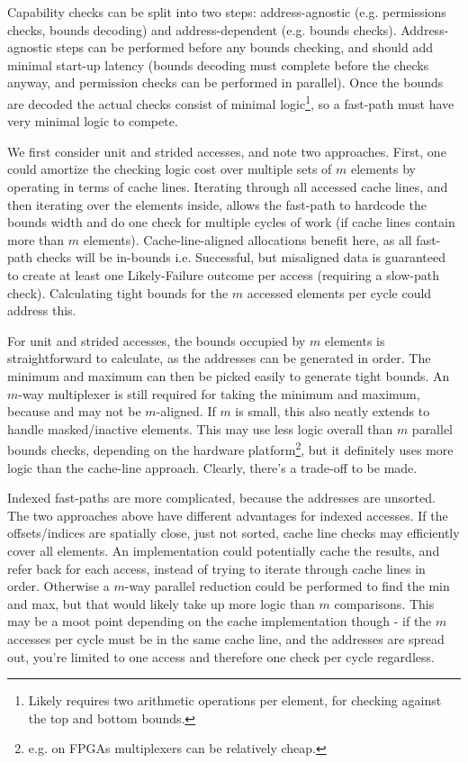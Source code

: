 Capability checks can be split into two steps: address-agnostic (e.g. permissions checks, bounds decoding) and address-dependent (e.g. bounds checks).
Address-agnostic steps can be performed before any bounds checking, and should add minimal start-up latency (bounds decoding must complete before the checks anyway, and permission checks can be performed in parallel).
Once the bounds are decoded the actual checks consist of minimal logic\footnote{Likely requires two arithmetic operations per element, for checking against the top and bottom bounds.}, so a fast-path must have very minimal logic to compete.

We first consider unit and strided accesses, and note two approaches.
First, one could amortize the checking logic cost over multiple sets of $m$ elements by operating in terms of cache lines.
Iterating through all accessed cache lines, and then iterating over the elements inside, allows the fast-path to hardcode the bounds width and do one check for multiple cycles of work (if cache lines contain more than $m$ elements).
Cache-line-aligned allocations benefit here, as all fast-path checks will be in-bounds i.e. Successful, but misaligned data is guaranteed to create at least one Likely-Failure outcome per access (requiring a slow-path check).
Calculating tight bounds for the $m$ accessed elements per cycle could address this.

For unit and strided accesses, the bounds occupied by $m$ elements is straightforward to calculate, as the addresses can be generated in order.
The minimum and maximum can then be picked easily to generate tight bounds.
An $m$-way multiplexer is still required for taking the minimum and maximum, because  and  may not be $m$-aligned.
If $m$ is small, this also neatly extends to handle masked/inactive elements.
This may use less logic overall than $m$ parallel bounds checks, depending on the hardware platform\footnote{e.g. on FPGAs multiplexers can be relatively cheap.}, but it definitely uses more logic than the cache-line approach.
Clearly, there's a trade-off to be made.

Indexed fast-paths are more complicated, because the addresses are unsorted.
The two approaches above have different advantages for indexed accesses.
If the offsets/indices are spatially close, just not sorted, cache line checks may efficiently cover all elements.
An implementation could potentially cache the results, and refer back for each access, instead of trying to iterate through cache lines in order.
Otherwise a $m$-way parallel reduction could be performed to find the min and max, but that would likely take up more logic than $m$ comparisons.
This may be a moot point depending on the cache implementation though - if the $m$ accesses per cycle must be in the same cache line, and the addresses are spread out, you're limited to one access and therefore one check per cycle regardless.

